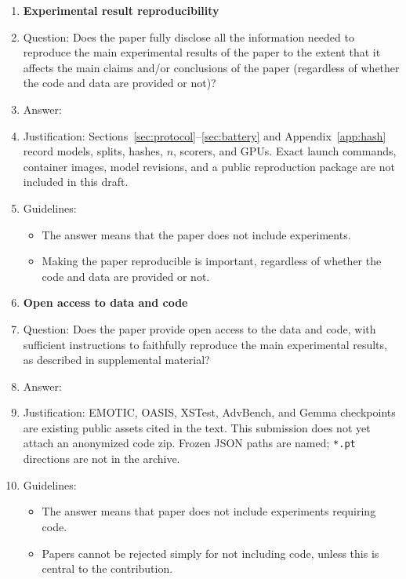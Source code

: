 \begin{enumerate}
\item {\bf Experimental result reproducibility}
\item[] Question: Does the paper fully disclose all the information needed to reproduce the main experimental results of the paper to the extent that it affects the main claims and/or conclusions of the paper (regardless of whether the code and data are provided or not)?
\item[] Answer: \answerNo{}
\item[] Justification: Sections~\ref{sec:protocol}--\ref{sec:battery} and Appendix~\ref{app:hash} record models, splits, hashes, $n$, scorers, and GPUs. Exact launch commands, container images, model revisions, and a public reproduction package are not included in this draft.
\item[] Guidelines:
\begin{itemize}
\item The answer \answerNA{} means that the paper does not include experiments.
\item Making the paper reproducible is important, regardless of whether the code and data are provided or not.
\end{itemize}

\item {\bf Open access to data and code}
\item[] Question: Does the paper provide open access to the data and code, with sufficient instructions to faithfully reproduce the main experimental results, as described in supplemental material?
\item[] Answer: \answerNo{}
\item[] Justification: EMOTIC, OASIS, XSTest, AdvBench, and Gemma checkpoints are existing public assets cited in the text. This submission does not yet attach an anonymized code zip. Frozen JSON paths are named; \texttt{*.pt} directions are not in the archive.
\item[] Guidelines:
\begin{itemize}
\item The answer \answerNA{} means that paper does not include experiments requiring code.
\item Papers cannot be rejected simply for not including code, unless this is central to the contribution.
\end{itemize}


\end{enumerate}
